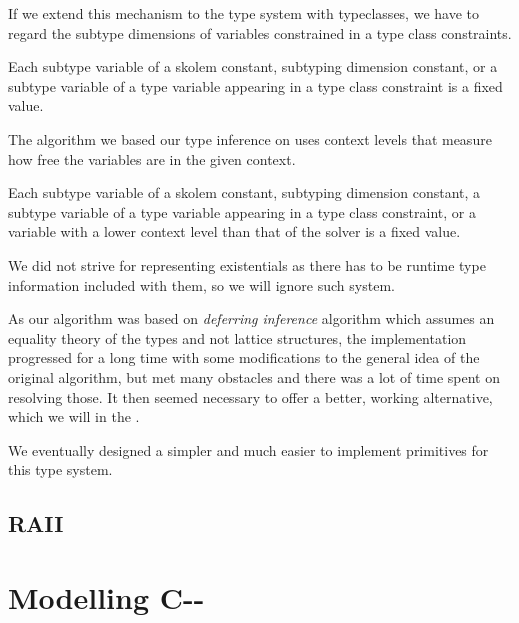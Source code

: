 If we extend this mechanism to the type system with typeclasses, we have to regard the subtype dimensions of variables constrained in a type class constraints.

\begin{defn}
    Each subtype variable of a skolem constant, subtyping dimension constant, or a subtype variable of a type variable appearing in a type class constraint is a fixed value.
\end{defn}


The algorithm we based our type inference on uses context levels that measure how free the variables are in the given context. 

\begin{defn}
    Each subtype variable of a skolem constant, subtyping dimension constant, a subtype variable of a type variable appearing in a type class constraint, or a variable with a lower context level than that of the solver is a fixed value.
\end{defn}

We did not strive for representing existentials as there has to be runtime type information included with them, so we will ignore such system.


As our algorithm was based on \textit{deferring inference} algorithm which assumes an equality theory of the types and not lattice structures, the implementation progressed for a long time with some modifications to the general idea of the original algorithm, but met many obstacles and there was a lot of time spent on resolving those. It then seemed necessary to offer a better, working alternative, which we will in the .

We eventually designed a simpler and much easier to implement primitives for this type system. 

\subsection{RAII}

\label{RAII}




\section{Modelling C-{}-}

